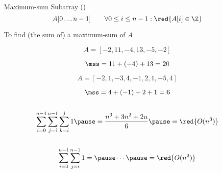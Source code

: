 
\begin{frame}{}
  \begin{exampleblock}{Maximum-sum Subarray (\mss)}
    \[
      A[0 \ldots n-1] \qquad \forall 0 \le i \le n-1: \red{A[i] \in \Z}
    \]

    \pause
    \begin{center}
      To find (the sum of) a maximum-sum  of $A$
    \end{center}
  \end{exampleblock}

  \pause
  \[
    A = [-2, 11, -4, 13, -5, -2]
  \]

  \pause
  \vspace{-0.30cm}
  \[
    \mss = 11 + (-4) + 13 = 20
  \]
  
  \pause
  \[
    A = [-2, 1, -3, 4, -1, 2, 1, -5, 4]
  \]

  \pause
  \vspace{-0.30cm}
  \[
    \mss = 4 + (-1) + 2 + 1 = 6
  \]
\end{frame}

\begin{frame}
  \begin{columns}
      \begin{center}
        
      \end{center}
  \end{columns}

  \pause
  \vspace{0.60cm}
  \[
    \sum_{i=0}^{n-1} \sum_{j=i}^{n-1} \sum_{k=i}^{j} 1 \pause = \frac{n^3 + 3n^2 + 2n}{6} \pause = \red{O(n^3)}
  \]
\end{frame}

\begin{frame}
  \begin{columns}
      \begin{center}
        
      \end{center}
  \end{columns}

  \pause
  \vspace{0.60cm}
  \[
    \sum_{i=0}^{n-1} \sum_{j=i}^{n-1} 1 = \pause \cdots \pause = \red{O(n^2)}
  \]
\end{frame}

